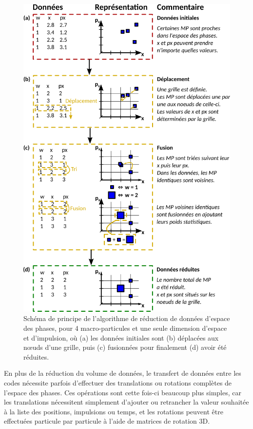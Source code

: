 \begin{refsection}
\begin{figure}[hbtp]
	\centering
	\includegraphics[width=\linewidth]{4-simulation/p2sat_reduction_donnees.png}
	\caption{Schéma de principe de l'algorithme de réduction de données d'espace des phases, pour 4 macro-particules et une seule dimension d'espace et d'impulsion, où (a) les données initiales sont (b) déplacées aux nœuds d'une grille, puis (c) fusionnées pour finalement (d) avoir été réduites.}
	\label{fig:4-p2sat_reduction_donnees}
\end{figure}

En plus de la réduction du volume de données, le transfert de données entre les codes nécessite parfois d'effectuer des translations ou rotations complètes de l'espace des phases. Ces opérations sont cette fois-ci beaucoup plus simples, car les translations nécessitent simplement d'ajouter ou retrancher la valeur souhaitée à la liste des positions, impulsions ou temps, et les rotations peuvent être effectuées particule par particule à l'aide de matrices de rotation 3D.


\end{refsection}
